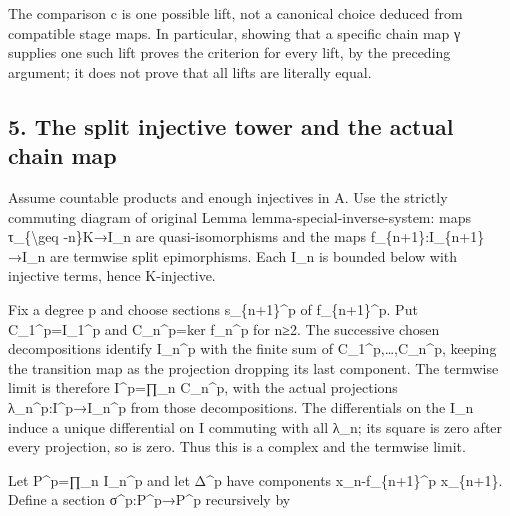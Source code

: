 The comparison c is one possible lift,\allowbreak{} not a canonical choice deduced from compatible stage maps. In particular,\allowbreak{} showing that a specific chain map γ supplies one such lift proves the criterion for every lift,\allowbreak{} by the preceding argument; it does not prove that all lifts are literally equal.

\subsection{5. The split injective tower and the actual chain map}\label{proofs-10435-10686-the-split-injective-tower-and-the-actual-chain-map}

Assume countable products and enough injectives in A. Use the strictly commuting diagram of original Lemma lemma-special-inverse-system:\allowbreak{} maps τ\_\allowbreak{}\{\textbackslash{}geq -n\}K\allowbreak{}→I\_\allowbreak{}n are quasi-isomorphisms and the maps f\_\allowbreak{}\{n\allowbreak{}+1\}:\allowbreak{}I\_\allowbreak{}\{n\allowbreak{}+1\}\allowbreak{}→I\_\allowbreak{}n are termwise split epimorphisms. Each I\_\allowbreak{}n is bounded below with injective terms,\allowbreak{} hence K-injective.

Fix a degree p and choose sections s\_\allowbreak{}\{n\allowbreak{}+1\}\textasciicircum{}p of f\_\allowbreak{}\{n\allowbreak{}+1\}\textasciicircum{}p. Put C\_\allowbreak{}1\textasciicircum{}p\allowbreak{}=I\_\allowbreak{}1\textasciicircum{}p and C\_\allowbreak{}n\textasciicircum{}p\allowbreak{}=ker f\_\allowbreak{}n\textasciicircum{}p for n≥2. The successive chosen decompositions identify I\_\allowbreak{}n\textasciicircum{}p with the finite sum of C\_\allowbreak{}1\textasciicircum{}p,\allowbreak{}…,\allowbreak{}C\_\allowbreak{}n\textasciicircum{}p,\allowbreak{} keeping the transition map as the projection dropping its last component. The termwise limit is therefore I\textasciicircum{}p\allowbreak{}=∏\_\allowbreak{}n C\_\allowbreak{}n\textasciicircum{}p,\allowbreak{} with the actual projections λ\_\allowbreak{}n\textasciicircum{}p:\allowbreak{}I\textasciicircum{}p\allowbreak{}→I\_\allowbreak{}n\textasciicircum{}p from those decompositions. The differentials on the I\_\allowbreak{}n induce a unique differential on I commuting with all λ\_\allowbreak{}n; its square is zero after every projection,\allowbreak{} so is zero. Thus this is a complex and the termwise limit.

Let P\textasciicircum{}p\allowbreak{}=∏\_\allowbreak{}n I\_\allowbreak{}n\textasciicircum{}p and let Δ\^{}p have components x\_\allowbreak{}n-f\_\allowbreak{}\{n\allowbreak{}+1\}\textasciicircum{}p x\_\allowbreak{}\{n\allowbreak{}+1\}. Define a section σ\textasciicircum{}p:\allowbreak{}P\textasciicircum{}p\allowbreak{}→P\textasciicircum{}p recursively by

